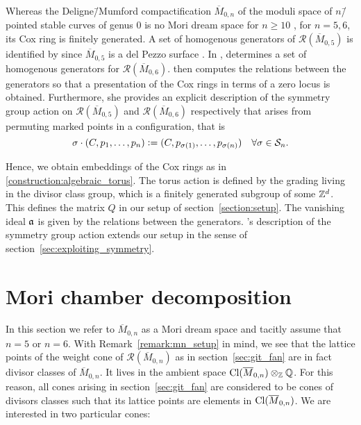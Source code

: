 \begin{remark}
	\label{remark:mn_setup}
	Whereas the Deligne\=/Mumford compactification $\overline{M}_{0,n}$ of the moduli space of $n$\=/pointed stable curves of genus $0$ is no Mori dream space for $n\geq 10$ \cite[Addendum 1.4]{on_blowing_up_the_weighted_projective_plane}, for $n=5,6$, its Cox ring is finitely generated. A set of homogenous generators of $\mathcal{R}(\overline{M}_{0,5})$ is identified by \cite{cox_ring_del_pezzo_surface} since $\overline{M}_{0,5}$ is a del Pezzo surface \cite{bernal}. In \cite{cox_ring_of_msix}, \citeauthor{cox_ring_of_msix} determines a set of homogenous generators for $\mathcal{R}(\overline{M}_{0,6})$. \citeauthor{bernal} \cite{bernal} then computes the relations between the generators so that a presentation of the Cox rings in terms of a zero locus is obtained. Furthermore, she provides an explicit description of the symmetry group action on $\mathcal{R}(\overline{M}_{0,5})$ and $\mathcal{R}(\overline{M}_{0,6})$ respectively that arises from permuting marked points in a configuration, that is 
	$$\sigma\cdot(C,p_1,\dots,p_n) \mathrel{\mathop:}= (C,p_{\sigma(1)},\dots,p_{\sigma(n)})\quad \forall\sigma\in \mathcal{S}_n.$$
	
	Hence, we obtain embeddings of the Cox rings as in \ref{construction:algebraic_torus}. The torus action is defined by the grading living in the divisor class group, which is a finitely generated subgroup of some $\mathbb{Z}^d$. This defines the matrix $Q$ in our setup of section~\ref{section:setup}. The vanishing ideal $\mathfrak{a}$ is given by the relations between the generators. \citeauthor{bernal}'s description of the symmetry group action extends our setup in the sense of section~\ref{sec:exploiting_symmetry}.
\end{remark}

\section{Mori chamber decomposition}

In this section we refer to $\overline{M}_{0,n}$ as a Mori dream space and tacitly assume that $n=5$ or $n=6$. With Remark~\ref{remark:mn_setup} in mind, we see that the lattice points of the weight cone of $\mathcal{R}(\overline{M}_{0,n})$ as in section~\ref{sec:git_fan} are in fact divisor classes of $\overline{M}_{0,n}$. It lives in the ambient space $\text{Cl}(\overline{M}_{0,n}) \otimes_{\mathbb{Z}} \mathbb{Q}$. For this reason, all cones arising in section~\ref{sec:git_fan} are considered to be cones of divisors classes such that its lattice points are elements in $\text{Cl}(\overline{M}_{0,n})$. We are interested in two particular cones:

